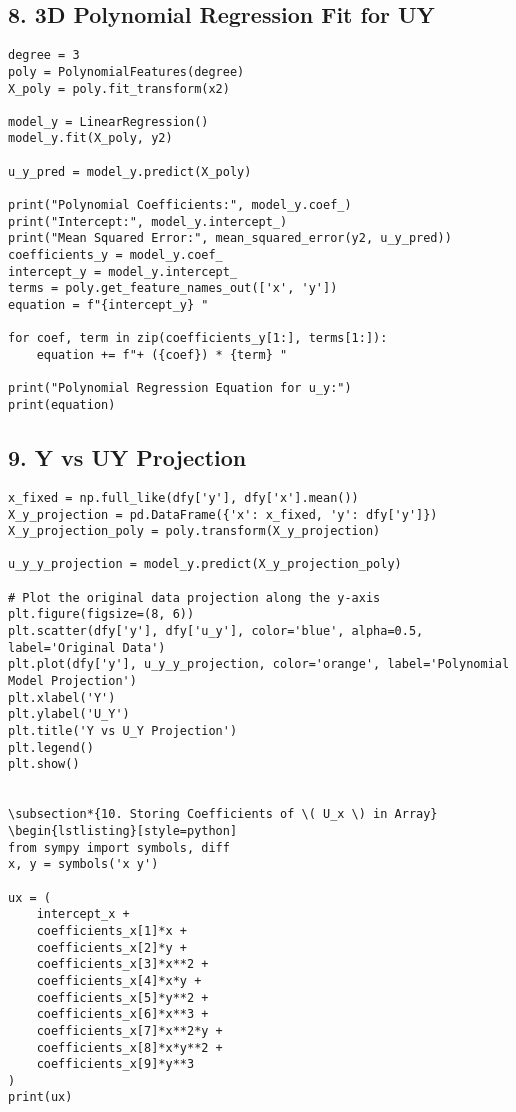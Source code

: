 \documentclass{article}
\begin{document}
\subsection*{8. 3D Polynomial Regression Fit for UY}
\begin{lstlisting}[style=python]
degree = 3
poly = PolynomialFeatures(degree)
X_poly = poly.fit_transform(x2)

model_y = LinearRegression()
model_y.fit(X_poly, y2)

u_y_pred = model_y.predict(X_poly)

print("Polynomial Coefficients:", model_y.coef_)
print("Intercept:", model_y.intercept_)
print("Mean Squared Error:", mean_squared_error(y2, u_y_pred))
coefficients_y = model_y.coef_
intercept_y = model_y.intercept_
terms = poly.get_feature_names_out(['x', 'y'])
equation = f"{intercept_y} "

for coef, term in zip(coefficients_y[1:], terms[1:]):
    equation += f"+ ({coef}) * {term} "

print("Polynomial Regression Equation for u_y:")
print(equation)
\end{lstlisting}

\subsection*{9. Y vs UY Projection}
\begin{lstlisting}[style=python]
x_fixed = np.full_like(dfy['y'], dfy['x'].mean())
X_y_projection = pd.DataFrame({'x': x_fixed, 'y': dfy['y']})
X_y_projection_poly = poly.transform(X_y_projection)

u_y_y_projection = model_y.predict(X_y_projection_poly)

# Plot the original data projection along the y-axis
plt.figure(figsize=(8, 6))
plt.scatter(dfy['y'], dfy['u_y'], color='blue', alpha=0.5, label='Original Data')
plt.plot(dfy['y'], u_y_y_projection, color='orange', label='Polynomial Model Projection')
plt.xlabel('Y')
plt.ylabel('U_Y')
plt.title('Y vs U_Y Projection')
plt.legend()
plt.show()


\subsection*{10. Storing Coefficients of \( U_x \) in Array}
\begin{lstlisting}[style=python]
from sympy import symbols, diff
x, y = symbols('x y')

ux = (
    intercept_x +
    coefficients_x[1]*x +
    coefficients_x[2]*y +
    coefficients_x[3]*x**2 +
    coefficients_x[4]*x*y +
    coefficients_x[5]*y**2 +
    coefficients_x[6]*x**3 +
    coefficients_x[7]*x**2*y +
    coefficients_x[8]*x*y**2 +
    coefficients_x[9]*y**3
)
print(ux)
\end{lstlisting}
\end{document}
